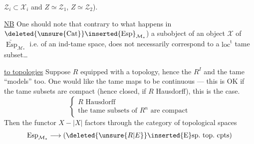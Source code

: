 $\mathcal Z_i\subset\mathcal X_i$ and $Z\simeq\mathcal Z_1$, $Z\simeq\mathcal Z_2$).

\uline{NB} One should note that contrary to what happens in $\deleted{\unsure{\operatorname{Cat}}}\inserted{\operatorname{Esp}}_{\mathcal M_*}$) a subobject of an object $\mathcal X$ of $\underrightarrow{\operatorname{Esp}}_{\mathcal M_*}$ i.e. of an ind-tame space, does not necessarily correspond to a $\mathrm{loc}^{\mathrm t}$ tame subset\ldots

\uline{ to topologies} Suppose $R$ equipped with a topology, hence the $R^I$ and the tame ``models'' too. One would like the tame maps to be continuous --- this is OK if the tame subsets are compact (hence closed, if $R$ Hausdorff), this is the case.  
\[
 \left\{\begin{array}{l}R\text{ Hausdorff}\\
 \text{the tame subsets of }R^n\text{ are compact}
 \end{array}\right.
\]
Then the functor $X\mathbin{-}|X|$ factors through the category of topological spaces
\[
 \operatorname{Esp}_{\mathcal M_*}\longrightarrow(\deleted{\unsure{R|E}}\inserted{\mathrm E}\mathrm{sp.\ top.\ cpts})
\]
